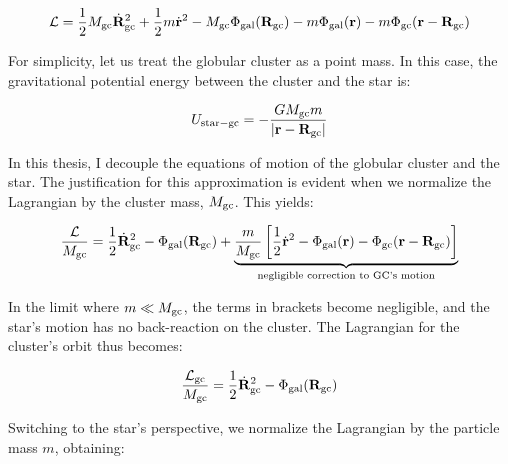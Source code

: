         \begin{equation}
            \mathcal{L} = \frac{1}{2} M_{\rm gc} \dot{\mathbf{R}}_{\rm gc}^2 
                        + \frac{1}{2} m \dot{\mathbf{r}}^2 
                        - M_{\rm gc} \Phi_{\rm gal}(\mathbf{R}_{\rm gc}) 
                        - m \Phi_{\rm gal}(\mathbf{r}) 
                        - m \Phi_{\rm gc}(\mathbf{r} - \mathbf{R}_{\rm gc})
        \end{equation}

        For simplicity, let us treat the globular cluster as a point mass. In this case, the gravitational potential energy between the cluster and the star is:

        \begin{equation}
            U_{\rm star-gc} = - \frac{G M_{\rm gc} m}{|\mathbf{r} - \mathbf{R}_{\rm gc}|}
        \end{equation}

        In this thesis, I decouple the equations of motion of the globular cluster and the star. The justification for this approximation is evident when we normalize the Lagrangian by the cluster mass, \( M_{\rm gc} \). This yields:

        \begin{equation}
            \frac{\mathcal{L}}{M_{\rm gc}} = \frac{1}{2} \dot{\mathbf{R}}_{\rm gc}^2 
                                        - \Phi_{\rm gal}(\mathbf{R}_{\rm gc}) 
                                        + \underbrace{\frac{m}{M_{\rm gc}} \left[ \frac{1}{2} \dot{\mathbf{r}}^2 
                                        - \Phi_{\rm gal}(\mathbf{r}) 
                                        - \Phi_{\rm gc}(\mathbf{r} - \mathbf{R}_{\rm gc}) \right]}_{\text{negligible correction to GC's motion}}
        \end{equation}

        In the limit where \( m \ll M_{\rm gc} \), the terms in brackets become negligible, and the star's motion has no back-reaction on the cluster. The Lagrangian for the cluster's orbit thus becomes:

        \begin{equation}
            \frac{\mathcal{L}_{\mathrm{gc}}}{M_{\mathrm{gc}}} = \frac{1}{2} \dot{\mathbf{R}}_{\rm gc}^2 
                                - \Phi_{\rm gal}(\mathbf{R}_{\rm gc})
        \end{equation}

        Switching to the star's perspective, we normalize the Lagrangian by the particle mass \( m \), obtaining:

